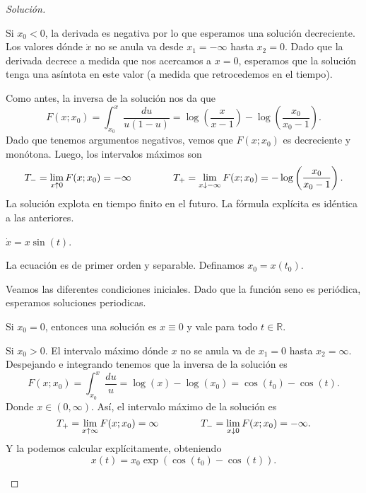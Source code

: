 \begin{proof}[Solución]
\begin{plist}
\begin{clist}
    \item Si \(x_0 < 0\), la derivada es negativa por lo que esperamos una
    solución decreciente. Los valores dónde \(\dot{x}\) no se anula va desde
    \(x_1 = -\infty\) hasta \(x_2 = 0\). Dado que la derivada decrece a medida
    que nos acercamos a \(x=0\), esperamos que la solución tenga una asíntota en
    este valor (a medida que retrocedemos en el tiempo).

    Como antes, la inversa de la solución nos da que
    \[
        F(x;x_0)
        =
        \int_{x_0}^{x} \frac{du}{u(1-u)}
        =
        \log\left(\frac{x}{x-1}\right) - \log\left(\frac{x_0}{x_0 - 1}\right)
    .\]
    Dado que tenemos argumentos negativos, vemos que \(F(x;x_0)\) es
    decreciente y monótona. Luego, los intervalos máximos son
    \[
        T_{-} = \lim_{x\uparrow 0} F(x;x_0)
        = -\infty
        \hspace{1.5cm}
        T_{+} = \lim_{x\downarrow -\infty} F(x;x_0)
        = -\log\left(\frac{x_0}{x_0-1}\right)
    .\]
    La solución explota en tiempo finito en el futuro. La fórmula explícita es
    idéntica a las anteriores.
\end{clist}
\item \(\dot{x} = x\sin(t)\).

La ecuación es de primer orden y separable. Definamos \(x_0 = x(t_0)\).

Veamos las diferentes condiciones iniciales. Dado que la función seno es
periódica, esperamos soluciones periodicas.

\begin{clist}
    \item Si \(x_0 = 0\), entonces una solución es \(x\equiv 0\) y vale
    para todo \(t\in \mathbb{R}\).

    \item Si \(x_0 > 0\). El intervalo máximo dónde \(x\) no se anula va de
    \(x_1=0\) hasta \(x_2 = \infty\). Despejando e integrando tenemos que
    la inversa de la solución es
    \[
        F(x;x_0) = \int_{x_0}^{x} \frac{du}{u} = \log(x) - \log(x_0)
        =
        \cos(t_0) - \cos(t)
    .\]
    Donde \(x \in (0, \infty)\). Así, el intervalo máximo de la solución es
    \[
        T_{+} = \lim_{x\uparrow \infty} F(x;x_0) = \infty
        \hspace{1.5cm}
        T_{-} = \lim_{x\downarrow 0} F(x;x_0) = -\infty
    .\]
    Y la podemos calcular explícitamente, obteniendo
    \[
        x(t) = x_0 \exp\left(\cos(t_0) - \cos(t)\right)
    .\]


\end{clist}
\end{plist}
\end{proof}

